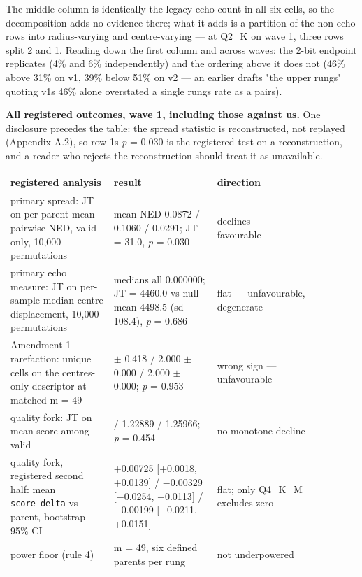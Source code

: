 The middle column is identically the legacy echo count in all six cells, so the decomposition adds no evidence there; what it adds is a partition of the non-echo rows into radius-varying and centre-varying --- at Q2\_K on wave 1, three rows split 2 and 1. Reading down the first column and across waves: the 2-bit endpoint replicates (4\% and 6\% independently) and the ordering above it does not (46\% above 31\% on v1, 39\% below 51\% on v2 --- an earlier draft\textquotesingle s "the upper rungs" quoting v1\textquotesingle s 46\% alone overstated a single rung\textquotesingle s rate as a pair\textquotesingle s).

\textbf{All registered outcomes, wave 1, including those against us.} One disclosure precedes the table: the spread statistic is reconstructed, not replayed (Appendix A.2), so row 1\textquotesingle s \emph{p} = 0.030 is the registered test on a reconstruction, and a reader who rejects the reconstruction should treat it as unavailable.

\small
\begin{longtable}[]{@{}>{\raggedright\arraybackslash}p{0.293\linewidth}>{\raggedright\arraybackslash}p{0.293\linewidth}>{\raggedright\arraybackslash}p{0.293\linewidth}@{}}
\toprule\noalign{}
registered analysis & result & direction \\
\midrule\noalign{}
\endhead
\bottomrule\noalign{}
\endlastfoot
primary spread: JT on per-parent mean pairwise NED, valid only, 10,000 permutations & mean NED 0.0872 / 0.1060 / 0.0291; JT = 31.0, \emph{p} = 0.030 & declines --- favourable \\
primary echo measure: JT on per-sample median centre displacement, 10,000 permutations & medians all 0.000000; JT = 4460.0 vs null mean 4498.5 (sd 108.4), \emph{p} = 0.686 & flat --- unfavourable, degenerate \\
Amendment 1 rarefaction: unique cells on the centres-only descriptor at matched m = 49 & 1.774 \(\pm\) 0.418 / 2.000 \(\pm\) 0.000 / 2.000 \(\pm\) 0.000; \emph{p} = 0.953 & wrong sign --- unfavourable \\
quality fork: JT on mean score among valid & 1.23855 / 1.22889 / 1.25966; \emph{p} = 0.454 & no monotone decline \\
quality fork, registered second half: mean \texttt{score\_delta} vs parent, bootstrap 95\% CI & +0.00725 {[}+0.0018, +0.0139{]} / \(-\)0.00329 {[}\(-\)0.0254, +0.0113{]} / \(-\)0.00199 {[}\(-\)0.0211, +0.0151{]} & flat; only Q4\_K\_M excludes zero \\
power floor (rule 4) & m = 49, six defined parents per rung & not underpowered \\
\end{longtable}
\normalsize

